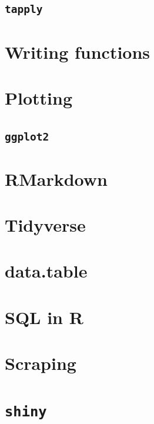 \documentclass[
]{book}
\begin{document}
\hypertarget{r-tapply}{%
\subsection{\texorpdfstring{\texttt{tapply}}{tapply}}\label{r-tapply}}

\hypertarget{r-writing-functions}{%
\section{Writing functions}\label{r-writing-functions}}

\hypertarget{r-plotting}{%
\section{Plotting}\label{r-plotting}}

\hypertarget{r-ggplot2}{%
\subsection{\texorpdfstring{\texttt{ggplot2}}{ggplot2}}\label{r-ggplot2}}

\hypertarget{r-rmarkdown}{%
\section{RMarkdown}\label{r-rmarkdown}}

\hypertarget{r-tidyverse}{%
\section{Tidyverse}\label{r-tidyverse}}

\hypertarget{r-datatable}{%
\section{data.table}\label{r-datatable}}

\hypertarget{r-sql}{%
\section{SQL in R}\label{r-sql}}

\hypertarget{r-scraping}{%
\section{Scraping}\label{r-scraping}}

\hypertarget{r-shiny}{%
\section{\texorpdfstring{\texttt{shiny}}{shiny}}\label{r-shiny}}
\end{document}
